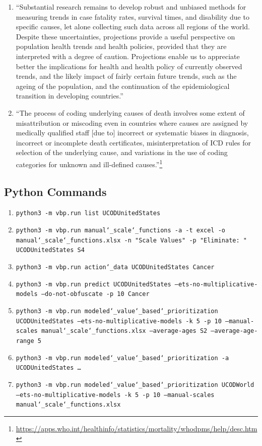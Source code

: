 \documentclass[10pt, a4paper, twocolumn]{IEEEconf}
\begin{document}
\begin{enumerate}
  \item \enquote{Substantial research remains to develop robust and unbiased methods for measuring trends in case fatality rates, survival times, and disability due to specific causes, let alone collecting such data across all regions of the world. Despite these uncertainties, projections provide a useful perspective on population health trends and health policies, provided that they are interpreted with a degree of caution. Projections enable us to appreciate better the implications for health and health policy of currently observed trends, and the likely impact of fairly certain future trends, such as the ageing of the population, and the continuation of the epidemiological transition in developing countries.} \citep{mathers2006projections}
  \item \enquote{The process of coding underlying causes of death involves some extent of misattribution or miscoding even in countries where causes are assigned by medically qualified staff [due to] incorrect or systematic biases in diagnosis, incorrect or incomplete death certificates, misinterpretation of ICD rules for selection of the underlying cause, and variations in the use of coding categories for unknown and ill-defined causes.}\footnote{\scriptsize{\url{https://apps.who.int/healthinfo/statistics/mortality/whodpms/help/desc.htm}}}
\end{enumerate}

\onecolumn
\subsection{Python Commands}

\begin{enumerate}
  \item \label{cmdlist} \texttt{python3 -m vbp.run list UCODUnitedStates}
  \item \label{cmdmanualscales} \texttt{python3 -m vbp.run manual\char`_scale\char`_functions -a -t excel -o manual\char`_scale\char`_functions.xlsx -n "Scale Values" -p "Eliminate: " UCODUnitedStates S4}
  \item \label{cmdcancerdata} \texttt{python3 -m vbp.run action\char`_data UCODUnitedStates Cancer}
  \item \label{cmdcancerpredict} \texttt{python3 -m vbp.run predict UCODUnitedStates --ets-no-multiplicative-models --do-not-obfuscate -p 10 Cancer}
  \item \label{cmdlongtermcomparable} \texttt{python3 -m vbp.run modeled\char`_value\char`_based\char`_prioritization UCODUnitedStates --ets-no-multiplicative-models -k 5 -p 10 --manual-scales manual\char`_scale\char`_functions.xlsx --average-ages S2 --average-age-range 5}
  \item \label{cmdmodeledvbpus} \texttt{python3 -m vbp.run modeled\char`_value\char`_based\char`_prioritization -a UCODUnitedStates \ldots}
  \item \label{cmdmodeledvbpworld} \texttt{python3 -m vbp.run modeled\char`_value\char`_based\char`_prioritization UCODWorld --ets-no-multiplicative-models -k 5 -p 10 --manual-scales manual\char`_scale\char`_functions.xlsx}
\end{enumerate}
\end{document}
